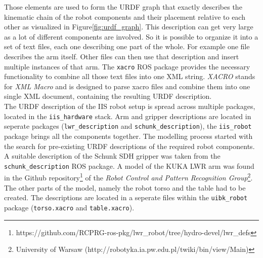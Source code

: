 Those elements are used to form the URDF graph that exactly describes the kinematic chain of the robot components and their placement relative to each other as visualized in Figure\ref{fig:urdf_graph}. This description can get very large as a lot of different components are involved. So it is possible to organize it into a set of text files, each one describing one part of the whole. For example one file describes the arm itself. Other files can then use that description and insert multiple instances of that arm. The \texttt{xacro} ROS package provides the necessary functionality to combine all those text files into one XML string. \emph{XACRO} stands for \emph{XML Macro} and is designed to parse xacro files and combine them into one single XML document, containing the resulting URDF description.\\

The URDF description of the IIS robot setup is spread across multiple packages, located in the \texttt{iis\_hardware} stack. Arm and gripper descriptions are located in seperate packages (\texttt{lwr\_description} and \texttt{schunk\_description}), the \texttt{iis\_robot} package brings all the components together. The modelling process started with the search for pre-existing URDF descriptions of the required robot components. A suitable description of the Schunk SDH gripper was taken from the \texttt{schunk\_description} ROS package. A model of the KUKA LWR arm was found in the Github repository\footnote{https://github.com/RCPRG-ros-pkg/lwr\_robot/tree/hydro-devel/lwr\_defs} of the \emph{Robot Control and Pattern Recognition Group}\footnote{University of Warsaw (http://robotyka.ia.pw.edu.pl/twiki/bin/view/Main)}. The other parts of the model, namely the robot torso and the table had to be created. The descriptions are located in a seperate files within the \texttt{uibk\_robot} package (\texttt{torso.xacro} and \texttt{table.xacro}).

